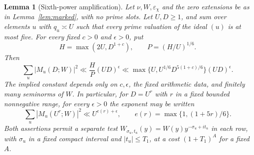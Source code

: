 \documentclass[11pt,a4paper]{article}
\numberwithin{equation}{section}
\numberwithin{figure}{section}
\newtheorem{lemma}[theorem]{Lemma}
\theoremstyle{definition}
\theoremstyle{remark}
\begin{document}
\begin{lemma}[Sixth-power amplification]\label{lem:inverse-amplification}
Let \(\nu,W,\varepsilon_\chi\) and the zero extensions be as in
Lemma~\ref{lem:marked}, with no prime slots.  Let \(U,D\ge1\), and
sum over elements \(u\) with \(q_u\asymp U\) such that every prime
valuation of the ideal \((u)\) is at most five.  For every fixed
\(c>0\) and \(\epsilon>0\), put
\[
 H=\max(2U,D^{1+c}),\qquad P=(H/U)^{1/6}.
\]
Then
\begin{equation}\label{eq:amplified-note}
 \sum_u|M_u(D;W)|^2
 \ll \frac HP(UD)^\epsilon
 \ll \max\{U,U^{1/6}D^{5(1+c)/6}\}(UD)^\epsilon.
\end{equation}
The implied constant depends only on \(c,\epsilon\), the fixed
arithmetic data, and finitely many seminorms of \(W\).  In particular,
for \(D=U^r\) with \(r\) in a fixed bounded nonnegative range, for
every \(\epsilon>0\) the exponent may be written
\[
 \sum_u|M_u(U^r;W)|^2\ll U^{e(r)+\epsilon},
 \qquad e(r)=\max\{1,(1+5r)/6\}.
\]
Both assertions permit a separate test
\(W_{\sigma_u,t_u}(y)=W(y)y^{-\sigma_u+it_u}\) in each row, with
\(\sigma_u\) in a fixed compact interval and \(|t_u|\le T_1\),
at a cost \((1+T_1)^A\) for a fixed \(A\).
\end{lemma}
\end{document}
